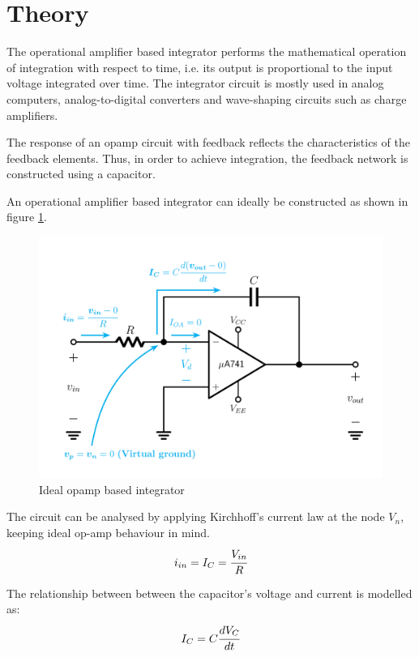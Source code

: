 \documentclass[12pt, titlepage]{article}
\theoremstyle{definition}
\begin{document}
  \newpage
  \section{Theory}
    The operational amplifier based integrator performs the mathematical operation of integration with respect to time, i.e. its output is proportional to the input voltage integrated over time.
    The integrator circuit is mostly used in analog computers, analog-to-digital converters and wave-shaping circuits such as charge amplifiers.

    The response of an opamp circuit with feedback reflects the characteristics of the feedback elements. Thus, in order to achieve integration, the feedback network is constructed using a capacitor.

    An operational amplifier based integrator can ideally be constructed as shown in figure \ref{fig:theoretical_ideal_integrator}.

    \begin{figure}[h]
      \centering
      \includegraphics[scale=0.25]{images/ideal_integrator.png}
      \caption{Ideal opamp based integrator}
      \label{fig:theoretical_ideal_integrator}
    \end{figure}

    The circuit can be analysed by applying Kirchhoff's current law at the node $V_n$, keeping ideal op-amp behaviour in mind.
    \begin{equation}\label{eq:ideal_kcl_vn}
      i_{in} = I_C = \cfrac{V_{in}}{R}
    \end{equation}

    The relationship between between the capacitor's voltage and current is modelled as:
    \begin{equation}\label{eq:ideal_i-v_cap}
      I_C = C\cfrac{dV_C}{dt}
    \end{equation}
\end{document}
